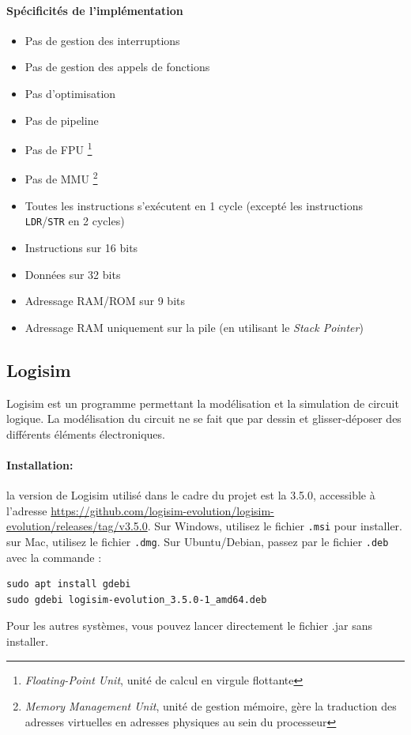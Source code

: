 \documentclass{article}
\begin{document}
    \paragraph{Spécificités de l'implémentation}
    \begin{itemize}
        \item Pas de gestion des interruptions
        \item Pas de gestion des appels de fonctions
        \item Pas d'optimisation
        \item Pas de pipeline
        \item Pas de FPU \footnote{\textit{Floating-Point Unit}, unité de calcul en virgule flottante}
        \item Pas de MMU \footnote{\textit{Memory Management Unit}, unité de gestion mémoire, gère la traduction des adresses virtuelles en adresses physiques au sein du processeur}
        \item Toutes les instructions s'exécutent en 1 cycle (excepté les instructions \texttt{LDR}/\texttt{STR} en 2 cycles)
        \item Instructions sur 16 bits
        \item Données sur 32 bits
        \item Adressage RAM/ROM sur 9 bits
        \item Adressage RAM uniquement sur la pile (en utilisant le \textit{Stack Pointer})
    \end{itemize}

    \subsection{Logisim}

    Logisim est un programme permettant la modélisation et la simulation de circuit logique.
    La modélisation du circuit ne se fait que par dessin et glisser-déposer des différents éléments électroniques.

    \paragraph{Installation:} la version de Logisim utilisé dans le cadre du projet est la 3.5.0, accessible à l'adresse \url{https://github.com/logisim-evolution/logisim-evolution/releases/tag/v3.5.0}.
    Sur Windows, utilisez le fichier \texttt{.msi} pour installer.
    sur Mac, utilisez le fichier \texttt{.dmg}.
    Sur Ubuntu/Debian, passez par le fichier \texttt{.deb} avec la commande :
    \begin{lstlisting}
sudo apt install gdebi
sudo gdebi logisim-evolution_3.5.0-1_amd64.deb
    \end{lstlisting}
    Pour les autres systèmes, vous pouvez lancer directement le fichier .jar sans installer.
\end{document}
